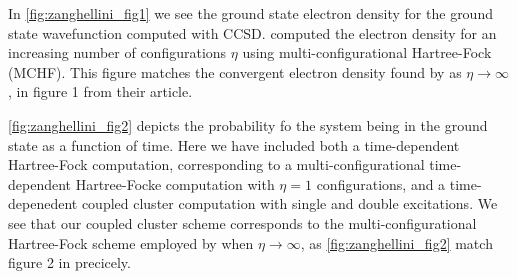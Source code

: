 In \autoref{fig:zanghellini_fig1} we see the ground state electron density for the 
ground state wavefunction computed with CCSD. \citeauthor{Zanghellini04} computed the electron
density for an increasing number of configurations $\eta$ using multi-configurational
Hartree-Fock (MCHF). This figure matches the convergent electron density found by
\citeauthor{Zanghellini04} as $\eta \to \infty$, in figure 1 from their article. 

\autoref{fig:zanghellini_fig2} depicts the probability fo the system being in the ground 
state as a function of time. Here we have included both a time-dependent Hartree-Fock
computation, corresponding to a multi-configurational time-dependent 
Hartree-Focke computation with $\eta=1$ configurations, and 
a time-depenedent coupled cluster computation with single and double excitations.
We see that our coupled cluster scheme corresponds to the multi-configurational Hartree-Fock 
scheme employed by \citeauthor{Zanghellini04} when $\eta\to\infty$, as
\autoref{fig:zanghellini_fig2} match figure 2 in
\citeauthor{Zanghellini04}\cite{Zanghellini04} precicely.
